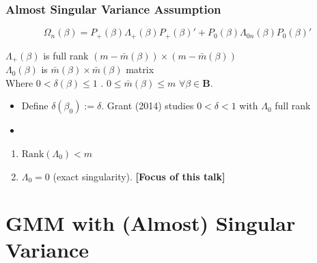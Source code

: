 \documentclass{beamer}
\begin{document}
\begin{frame}
\frametitle{Almost Singular Variance Assumption}
\begin{center}
\end{center}\begin{equation} \Omega_n(\beta)=P_+(\beta)\Lambda_+(\beta)P_+(\beta)'+P_0(\beta)\Lambda_{0n}(\beta)P_0(\beta)'\end{equation}
\vspace{5pt}
\begin{center}
 $\Lambda_+(\beta)$ is full rank $(m-\bar{m}(\beta))\times (m-\bar{m}(\beta))$ \\

 \vspace{10pt}
   $ \Lambda_0(\beta)$ is  $\bar{m}(\beta)\times \bar{m}(\beta)$ matrix\\
   \vspace{10pt}
Where $0<\delta(\beta)\leq 1$ . $0 \leq \bar{m}(\beta) \leq m$ $\forall \beta \in \mathbf{B}$.
\end{center}
\pause

  \begin{itemize}
  \vspace{5pt}
  \item[]Define $\delta(\beta_0):=\delta$. Grant (2014) studies $0<\delta<1$  with $\Lambda_0$ full rank
  \vspace{5pt}


  \item[]

    \end{itemize}
    \begin{enumerate}
  \item[a] $\textrm{Rank}(\Lambda_0)<m$
    \vspace{5pt}

  \item[b] $\Lambda_0=0$ (exact singularity). \textbf{[Focus of this talk]}
  \end{enumerate}
  \end{frame}

\section{GMM with (Almost) Singular Variance}
\end{document}
